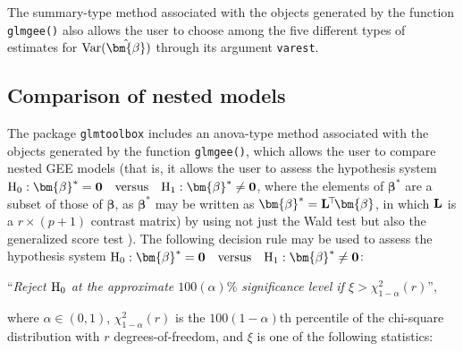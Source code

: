 The summary-type method associated with the objects generated by the function {\tt glmgee()} also allows the user to choose among the five different types of estimates for ${\rm Var}(\hat{\bm{\beta}})$ through its argument {\tt varest}.

\subsection{Comparison of nested models}
The package {\tt glmtoolbox} includes an anova-type method associated with the objects generated by the function {\tt glmgee()}, which allows the user to compare nested GEE models (that is, it allows the user to assess the hypothesis system ${\rm H}_0:\bm{\beta}^{*}={\bf 0}\quad {\rm versus} \quad {\rm H}_1:\bm{\beta}^{*}\ne{\bf 0}$, where the elements of $\bm{\beta}^{*}$ are a subset of those of $\bm{\beta}$, as $\bm{\beta}^{*}$ may be written as $\bm{\beta}^{*}={\bf L}^{\!\top}\!\bm{\beta}$, in which ${\bf L}$ is a $r\times (p+1)$ contrast matrix) by using not just the Wald test but also the generalized score test \citep{RJ90,B92}). The following decision rule may be used to assess the hypothesis system ${\rm H}_0:\bm{\beta}^{*}={\bf 0}\quad {\rm versus} \quad {\rm H}_1:\bm{\beta}^{*}\ne{\bf 0}$:

\begin{center}
``{\it Reject ${\rm H}_0$ at the approximate $100(\alpha)\%$ significance level if $\xi>\chi^2_{1-\alpha}(r)$}'', 
\end{center}
where $\alpha\in(0,1)$, $\chi^2_{1-\alpha}(r)$ is the $100(1-\alpha)$th percentile of the chi-square distribution with $r$ degrees-of-freedom, 
and $\xi$ is one of the following statistics:

